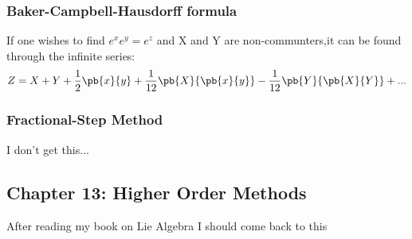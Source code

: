 \subsubsection{Baker-Campbell-Hausdorff formula}
If one wishes to find $e^xe^y=e^z$ and X and Y are non-communters,it can be found through the infinite series:
\[
Z = X + Y + \frac{1}{2} \pb{x}{y} + \frac{1}{12} \pb{X}{\pb{x}{y}} - \frac{1}{12} \pb{Y}{\pb{X}{Y}} + ...
  \]
\subsubsection{Fractional-Step Method}
I don't get this...

\subsection{Chapter 13: Higher Order Methods}

After reading my book on Lie Algebra I should come back to this
